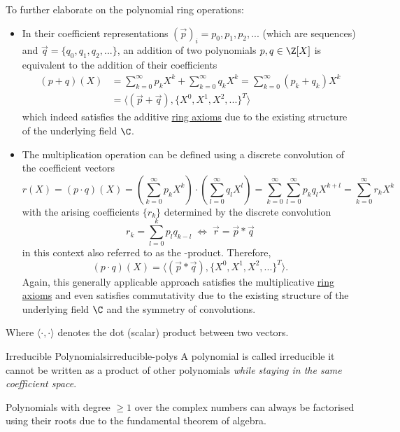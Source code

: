 To further elaborate on the polynomial ring operations:
\begin{itemize}
  \item In their coefficient representations $(\vec{p})_i = p_0, p_1, p_2, ...$ (which are sequences) and $\vec{q} = \{q_0, q_1, q_2, ...\}$,
        an addition of two polynomials $p, q \in \Z[X]$ is equivalent to the addition of their coefficients
        \begin{align*}
          (p + q)(X) & = \sum_{k=0}^\infty p_k X^k + \sum_{k=0}^\infty q_k X^k = \sum_{k=0}^\infty (p_k + q_k) X^k \\
                     & = \langle (\vec{p} + \vec{q}), \{X^0, X^1, X^2, ...\}^T \rangle
        \end{align*}
        which indeed satisfies the additive \hyperref[def:ring]{ring axioms}
        due to the existing structure of the underlying field $\C$.
  \item The multiplication operation can be defined using a discrete convolution of the coefficient vectors
        $$r(X) = (p \cdot q)(X) = (\sum_{k=0}^\infty p_k X^k) \cdot (\sum_{l=0}^\infty q_l X^l)
          = \sum_{k=0}^\infty \sum_{l=0}^\infty p_k q_l X^{k+l}
          = \sum_{k=0}^\infty r_k X^k$$
        with the arising coefficients $\{r_k\}$ determined by the discrete convolution
        $$r_k = \sum_{l=0}^k p_l q_{k-l} \;\Leftrightarrow\; \vec{r} = \vec{p} * \vec{q}$$
        in this context also referred to as the -product. Therefore,
        $$(p \cdot q)(X) = \langle (\vec{p} * \vec{q}), \{X^0, X^1, X^2, ...\}^T \rangle.$$
        Again, this generally applicable approach satisfies the multiplicative \hyperref[def:ring]{ring axioms}
        and even satisfies commutativity due to the existing structure of the underlying field $\C$
        and the symmetry of convolutions.
\end{itemize}

Where $\langle \cdot, \cdot \rangle$ denotes the dot (scalar) product between two vectors.

\begin{definition}{Irreducible Polynomials}{irreducible-polys}
  A polynomial is called irreducible  it cannot be written as a product of other polynomials
  \textsl{while staying in the same coefficient space}.
\end{definition}

Polynomials with degree $\geq 1$ over the complex numbers can always be factorised using their roots
due to the fundamental theorem of algebra.

